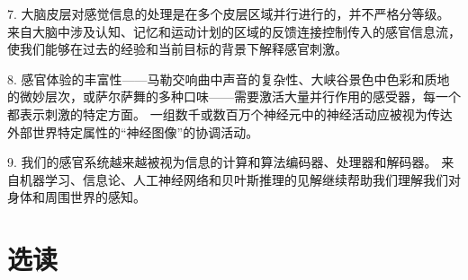 7. 大脑皮层对感觉信息的处理是在多个皮层区域并行进行的，并不严格分等级。 
来自大脑中涉及认知、记忆和运动计划的区域的反馈连接控制传入的感官信息流，使我们能够在过去的经验和当前目标的背景下解释感官刺激。 


8. 感官体验的丰富性——马勒交响曲中声音的复杂性、大峡谷景色中色彩和质地的微妙层次，或萨尔萨舞的多种口味——需要激活大量并行作用的感受器，每一个都表示刺激的特定方面。 
一组数千或数百万个神经元中的神经活动应被视为传达外部世界特定属性的“神经图像”的协调活动。 


9. 我们的感官系统越来越被视为信息的计算和算法编码器、处理器和解码器。 
来自机器学习、信息论、人工神经网络和贝叶斯推理的见解继续帮助我们理解我们对身体和周围世界的感知。

\section{选读}